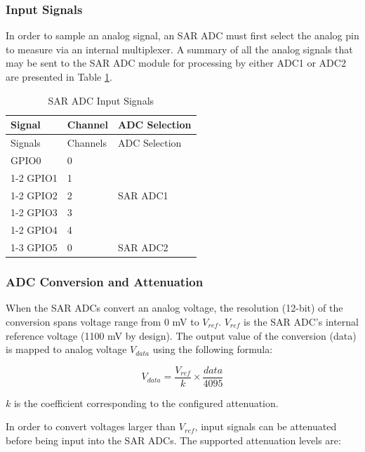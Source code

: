 \documentclass[main\_\_EN.tex]{subfiles}
\begin{document}
\subsubsection{Input Signals}

In order to sample an analog signal, an SAR ADC must first select the analog pin to measure via an internal multiplexer. A summary of all the analog signals that may be sent to the SAR ADC module for processing by either ADC1 or ADC2 are presented in Table \ref{tab:sensor-sar-adc-input-signals}.

\begin{longtable}{ |p{2.5cm}|p{1.5cm}|p{2.5cm}| }
    \caption{SAR ADC Input Signals}
    \label{tab:sensor-sar-adc-input-signals}
    \\\hline
    \rowcolor{lightgray}
    Signal  & Channel  & ADC Selection \\ \hline
    \endfirsthead
    \hline
    \rowcolor{lightgray}  
    Signals  & Channels  & ADC Selection \\ \hline
    \endhead
    \hline
    \endfoot
    GPIO0       &  0  & \multirow{5}{*}{SAR ADC1} \\ \cline{1-2}
    GPIO1       &  1  & \\ \cline{1-2}
    GPIO2       &  2  & \\ \cline{1-2}
    GPIO3       &  3  & \\ \cline{1-2}
    GPIO4       &  4  & \\ \cline{1-3}
    GPIO5       &  0  & SAR ADC2 \\ \hline
\end{longtable}

\subsubsection{ADC Conversion and Attenuation}

When the SAR ADCs convert an analog voltage, the resolution (12-bit) of the conversion spans voltage range from 0 mV to \(V_{ref}\). \(V_{ref}\) is the SAR ADC's internal reference voltage (1100 mV by design). The output value of the conversion (data) is mapped to analog voltage \(V_{data}\) using the following formula:

    \[
    V_{data} = \frac{V_{ref}}{k}\times{\frac{data}{4095}}
    \]

\(k\) is the coefficient corresponding to the configured attenuation.

In order to convert voltages larger than \(V_{ref}\), input signals can be attenuated before being input into the SAR ADCs. The supported attenuation levels are:
\end{document}
